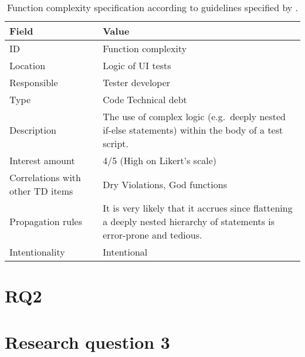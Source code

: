 	
	\begin{table}[!htbp]
		\centering
		\tabulinesep=1.2mm
		\begin{tabu} to \textwidth {|X|X[3]|}
			
			\hline
			\textbf{Field} & \textbf{Value} \\ 
			\hline
			
			ID & Function complexity \\
			\hline
			
			Location & Logic of UI tests \\
			\hline
			
			Responsible & Tester developer \\
			\hline
			
			Type & Code Technical debt \\
			\hline	
			
			Description & The use of complex logic (e.g.\ deeply nested if-else statements) within the body of a test script.\\
			\hline
			
			
			
			Interest amount &  4/5 (High on Likert's scale) \\
			\hline
			
			
			
			Correlations with other TD items & Dry Violations, God functions\\
			\hline 	 
			
			
			
			Propagation rules & It is very likely that it accrues since flattening a deeply nested hierarchy of statements is error-prone and tedious.\\
			\hline
			
			Intentionality & Intentional \\
			\hline 	 	
			
		\end{tabu}
		\label{tab:res-function-complexity}
		\caption[Function complexity specification]{Function complexity specification according to guidelines specified by \cite{mapping_study_td}.}
	\end{table}


\section{RQ2}

\section{Research question 3} \label{sec:res_rq3}


